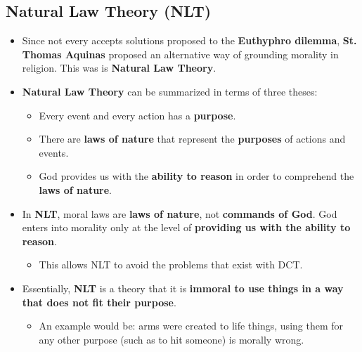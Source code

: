 \documentclass{article}
\begin{document}
    \subsection*{Natural Law Theory (NLT)}
    \begin{itemize}
        \item Since not every accepts solutions proposed to the \textbf{Euthyphro dilemma}, \textbf{St. Thomas Aquinas} proposed an alternative way of grounding morality in religion. This was is \textbf{Natural Law Theory}.
        \item \textbf{Natural Law Theory} can be summarized in terms of three theses:
        \begin{itemize}
            \item Every event and every action has a \textbf{purpose}.
            \item There are \textbf{laws of nature} that represent the \textbf{purposes} of actions and events.
            \item God provides us with the \textbf{ability to reason} in order to comprehend the \textbf{laws of nature}.
        \end{itemize}
        \item In \textbf{NLT}, moral laws are \textbf{laws of nature}, not \textbf{commands of God}. God enters into morality only at the level of \textbf{providing us with the ability to reason}.
        \begin{itemize}
            \item This allows NLT to avoid the problems that exist with DCT.
        \end{itemize}
        \item Essentially, \textbf{NLT} is a theory that it is \textbf{immoral to use things in a way that does not fit their purpose}.
        \begin{itemize}
            \item An example would be: arms were created to life things, using them for any other purpose (such as to hit someone) is morally wrong.
        \end{itemize}
    \end{itemize}
\end{document}
